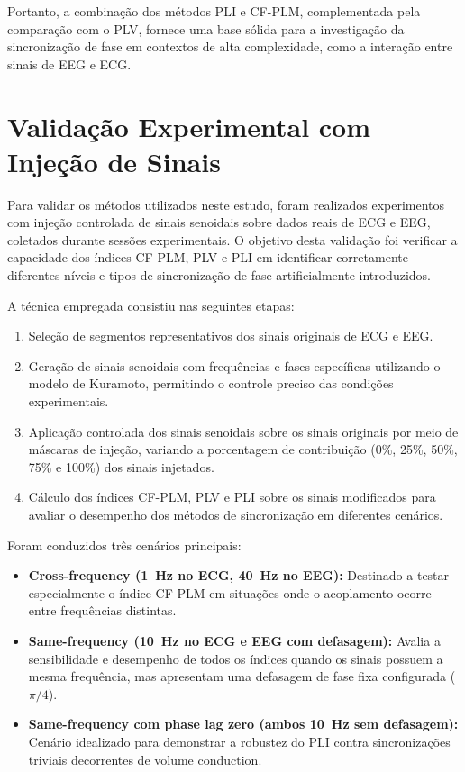 Portanto, a combinação dos métodos PLI e CF-PLM, complementada pela comparação com o PLV, fornece uma base sólida para a investigação da sincronização de fase em contextos de alta complexidade, como a interação entre sinais de EEG e ECG.

\section{Validação Experimental com Injeção de Sinais}

Para validar os métodos utilizados neste estudo, foram realizados experimentos com injeção controlada de sinais senoidais sobre dados reais de ECG e EEG, coletados durante sessões experimentais. O objetivo desta validação foi verificar a capacidade dos índices CF-PLM, PLV e PLI em identificar corretamente diferentes níveis e tipos de sincronização de fase artificialmente introduzidos.

A técnica empregada consistiu nas seguintes etapas:
\begin{enumerate}
    \item Seleção de segmentos representativos dos sinais originais de ECG e EEG.
    \item Geração de sinais senoidais com frequências e fases específicas utilizando o modelo de Kuramoto, permitindo o controle preciso das condições experimentais.
    \item Aplicação controlada dos sinais senoidais sobre os sinais originais por meio de máscaras de injeção, variando a porcentagem de contribuição (0\%, 25\%, 50\%, 75\% e 100\%) dos sinais injetados.
    \item Cálculo dos índices CF-PLM, PLV e PLI sobre os sinais modificados para avaliar o desempenho dos métodos de sincronização em diferentes cenários.
\end{enumerate}

Foram conduzidos três cenários principais:

\begin{itemize}
    \item \textbf{Cross-frequency (1~Hz no ECG, 40~Hz no EEG):} Destinado a testar especialmente o índice CF-PLM em situações onde o acoplamento ocorre entre frequências distintas.
    \item \textbf{Same-frequency (10~Hz no ECG e EEG com defasagem):} Avalia a sensibilidade e desempenho de todos os índices quando os sinais possuem a mesma frequência, mas apresentam uma defasagem de fase fixa configurada (\(\pi/4\)).
    \item \textbf{Same-frequency com phase lag zero (ambos 10~Hz sem defasagem):} Cenário idealizado para demonstrar a robustez do PLI contra sincronizações triviais decorrentes de volume conduction.
\end{itemize}


